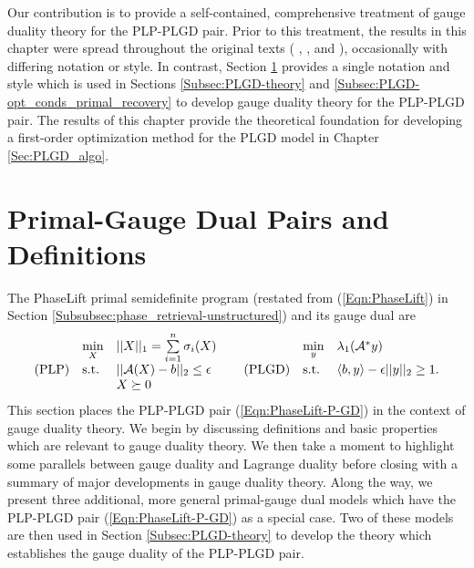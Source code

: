 Our contribution is to provide a self-contained, comprehensive treatment of gauge duality theory for the PLP-PLGD pair.  
Prior to this treatment, the results in this chapter were spread throughout the original texts ( \hspace{-0.24cm} \cite{rockafellar1970convex}, \cite{DBLP:journals/siamjo/FriedlanderMP14}, and \cite{DBLP:journals/siamsc/FriedlanderM16}), occasionally with differing notation or style.  
In contrast, Section \ref{Subsec:PLGD-models_intro} provides a single notation and style which is used in Sections \ref{Subsec:PLGD-theory} and \ref{Subsec:PLGD-opt_conds_primal_recovery} to develop gauge duality theory for the PLP-PLGD pair.  
The results of this chapter provide the theoretical foundation for developing a first-order optimization method for the PLGD model in Chapter \ref{Sec:PLGD_algo}.


\section{Primal-Gauge Dual Pairs and Definitions}		\label{Subsec:PLGD-models_intro}



The PhaseLift primal semidefinite program (restated from (\ref{Eqn:PhaseLift}) in Section \ref{Subsubsec:phase_retrieval-unstructured}) and its gauge dual are
\begin{equation} \label{Eqn:PhaseLift-P-GD}
\begin{array}{lllllll}
	&	\min\limits_{\substack{X}}
		&	||X||_1 = \sum\limits_{\substack{i=1}}^{\substack{n}} \sigma_i(X)
			&
				&	\min\limits_{\substack{y}}
					&	\lambda_1({\mathcal A}^* y)
						\\
\textnormal{(PLP)}
	&	\textnormal{s.t.}
		& 	|| {\mathcal A} (X) - b ||_2 \leq \epsilon
			&	\hspace{0.4cm} 	\textnormal{(PLGD)}
				&	\textnormal{s.t.}
					&	\langle b, y \rangle - \epsilon ||y||_2 \geq 1.
						\\

	&
		&	X \succeq 0

\end{array}
\end{equation}
This section places the PLP-PLGD pair (\ref{Eqn:PhaseLift-P-GD}) in the context of gauge duality theory.  We begin by discussing definitions and basic properties which are relevant to gauge duality theory. 
We then take a moment to highlight some parallels between gauge duality and Lagrange duality before closing with a summary of major developments in gauge duality theory.  
Along the way, we present three additional, more general primal-gauge dual models which have the PLP-PLGD pair (\ref{Eqn:PhaseLift-P-GD}) as a special case.  Two of these models are then used in Section \ref{Subsec:PLGD-theory} to develop the theory which establishes the gauge duality of the PLP-PLGD pair.





